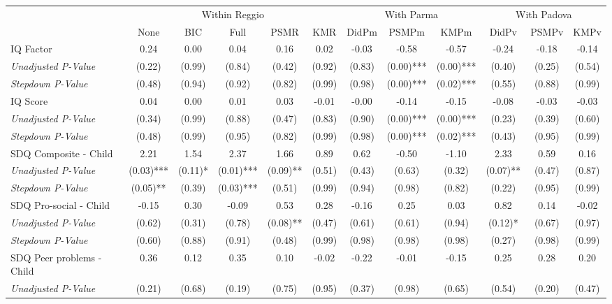\begin{tabular}{l c c c c c c c c c c c}
\toprule
& \multicolumn{5}{c}{Within Reggio} & \multicolumn{3}{c}{With Parma} & \multicolumn{3}{c}{With Padova} \\\cmidrule(lr){2-6} \cmidrule(lr){7-9} \cmidrule(lr){10-12}
 & None & BIC & Full & PSMR & KMR & DidPm & PSMPm & KMPm & DidPv & PSMPv & KMPv \\
\midrule
IQ Factor & 0.24 & 0.00 & 0.04 & 0.16 & 0.02 & -0.03 & -0.58 & -0.57 & -0.24 & -0.18 & -0.14 \\
\quad \textit{Unadjusted P-Value} & (0.22) & (0.99) & (0.84) & (0.42) & (0.92) & (0.83) & (0.00)*** & (0.00)*** & (0.40) & (0.25) & (0.54) \\
\quad \textit{Stepdown P-Value} & (0.48) & (0.94) & (0.92) & (0.82) & (0.99) & (0.98) & (0.00)*** & (0.02)*** & (0.55) & (0.88) & (0.99) \\
IQ Score & 0.04 & 0.00 & 0.01 & 0.03 & -0.01 & -0.00 & -0.14 & -0.15 & -0.08 & -0.03 & -0.03 \\
\quad \textit{Unadjusted P-Value} & (0.34) & (0.99) & (0.88) & (0.47) & (0.83) & (0.90) & (0.00)*** & (0.00)*** & (0.23) & (0.39) & (0.60) \\
\quad \textit{Stepdown P-Value} & (0.48) & (0.99) & (0.95) & (0.82) & (0.99) & (0.98) & (0.00)*** & (0.02)*** & (0.43) & (0.95) & (0.99) \\
SDQ Composite - Child & 2.21 & 1.54 & 2.37 & 1.66 & 0.89 & 0.62 & -0.50 & -1.10 & 2.33 & 0.59 & 0.16 \\
\quad \textit{Unadjusted P-Value} & (0.03)*** & (0.11)* & (0.01)*** & (0.09)** & (0.51) & (0.43) & (0.63) & (0.32) & (0.07)** & (0.47) & (0.87) \\
\quad \textit{Stepdown P-Value} & (0.05)** & (0.39) & (0.03)*** & (0.51) & (0.99) & (0.94) & (0.98) & (0.82) & (0.22) & (0.95) & (0.99) \\
SDQ Pro-social - Child & -0.15 & 0.30 & -0.09 & 0.53 & 0.28 & -0.16 & 0.25 & 0.03 & 0.82 & 0.14 & -0.02 \\
\quad \textit{Unadjusted P-Value} & (0.62) & (0.31) & (0.78) & (0.08)** & (0.47) & (0.61) & (0.61) & (0.94) & (0.12)* & (0.67) & (0.97) \\
\quad \textit{Stepdown P-Value} & (0.60) & (0.88) & (0.91) & (0.48) & (0.99) & (0.98) & (0.98) & (0.98) & (0.27) & (0.98) & (0.99) \\
SDQ Peer problems - Child & 0.36 & 0.12 & 0.35 & 0.10 & -0.02 & -0.22 & -0.01 & -0.15 & 0.25 & 0.28 & 0.20 \\
\quad \textit{Unadjusted P-Value} & (0.21) & (0.68) & (0.19) & (0.75) & (0.95) & (0.37) & (0.98) & (0.65) & (0.54) & (0.20) & (0.47) \\

\end{tabular}
